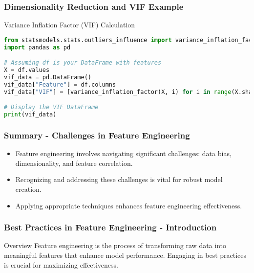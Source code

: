 \documentclass[aspectratio=169]{beamer}
\begin{document}
\begin{frame}[fragile]
    \frametitle{Dimensionality Reduction and VIF Example}
    \begin{block}{Variance Inflation Factor (VIF) Calculation}
        \begin{lstlisting}[language=Python]
from statsmodels.stats.outliers_influence import variance_inflation_factor
import pandas as pd

# Assuming df is your DataFrame with features
X = df.values
vif_data = pd.DataFrame()
vif_data["Feature"] = df.columns
vif_data["VIF"] = [variance_inflation_factor(X, i) for i in range(X.shape[1])]

# Display the VIF DataFrame
print(vif_data)
        \end{lstlisting}
    \end{block}
\end{frame}

\begin{frame}[fragile]
    \frametitle{Summary - Challenges in Feature Engineering}
    \begin{itemize}
        \item Feature engineering involves navigating significant challenges: data bias, dimensionality, and feature correlation.
        \item Recognizing and addressing these challenges is vital for robust model creation.
        \item Applying appropriate techniques enhances feature engineering effectiveness.
    \end{itemize}
\end{frame}

\begin{frame}[fragile]
    \frametitle{Best Practices in Feature Engineering - Introduction}
    \begin{block}{Overview}
        Feature engineering is the process of transforming raw data into meaningful features that enhance model performance. 
        Engaging in best practices is crucial for maximizing effectiveness.
    \end{block}
\end{frame}
\end{document}
